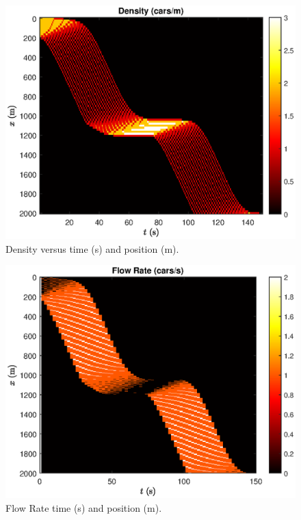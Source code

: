 \documentclass[12pt]{article}
\begin{document}
  \begin{figure}[H]
  \includegraphics[width=13cm]{BottleNeck5.eps}
  \centering
  \caption{Density versus time (s) and position (m).}
  \label{fig:obstacleDensity}
  \end{figure}

  \begin{figure}[H]
    \includegraphics[width=13cm]{BottleNeck6.eps}
    \centering
    \caption{Flow Rate time (s) and position (m).}
    \label{fig:obstacleFlow}
    \end{figure}
\end{document}
